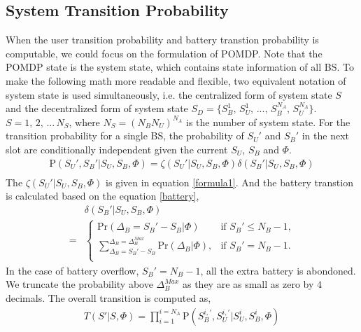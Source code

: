 \documentclass[conference]{IEEEtran}
\begin{document}
\subsection{System Transition Probability}
When the user transition probability and battery transtion probability is computable,
we could focus on the formulation of POMDP.
Note that the POMDP state is the system state, which contains state information of all BS.
To make the following math more readable and flexible,
two equivalent notation of system state is used simultaneously, i.e.
the centralized form of system state \(S\) and
the decentralized form of system state \(S_D = \{S_B^1,\,S_U^1,\,...,\,S_B^{N_A},\,S_U^{N_A}\}\).
\(S = 1,\,2,\, ... \,N_S\), where \(N_S = \left(N_BN_U\right)^{N_A}\) is the number of system state.
For the transition probability for a single BS,
the probability of \(S_U'\) and \(S_B'\) in the next slot are conditionally independent
given the current \(S_U\), \(S_B\) and \(\Phi\).
\begin{equation}
\begin{aligned}
	\mbox{P}\left(S_U',S_B'|S_U,S_B,\Phi\right) =
	\zeta\left(S_U'|S_U, S_B, \Phi\right) \delta\left(S_B'|S_U, S_B, \Phi\right)\\
\end{aligned}
\end{equation}
The \(\zeta\left(S_U'|S_U, S_B, \Phi\right)\) is given in equation \eqref{formula1}.
And the battery transtion is calculated based on the equation \eqref{battery},
\begin{align}
	&\delta\left(S_B'|S_U, S_B, \Phi\right)\nonumber\\
	= &
	\begin{cases}
		\mbox{Pr}\left(\Delta_B = S_B' - S_B|\Phi \right) &\mbox{if $S_B' \le N_B - 1$,}\\
		\sum_{\Delta_B = S_B' - S_B}^{\Delta_B = \Delta_B^{Max}}\mbox{Pr}\left(\Delta_B|\Phi\right),
		&\mbox{if $S_B' = N_B - 1$.}\\
\end{cases}
\end{align}
In the case of battery overflow, \(S_B'=N_B - 1\), all the extra battery is abondoned.
We truncate the probability above \(\Delta_B^{Max}\) as they are as small as zero by \(4\) decimals.
The overall transition is computed as,
\begin{align}\label{transition}
	T\left(S'|S,\Phi\right) = \prod_{i = 1}^{i = N_A}\mbox{P}\left(S_B^{i,'}, S_U^{i,'}|S_U^i, S_B^i, \Phi\right)
\end{align}
\end{document}

